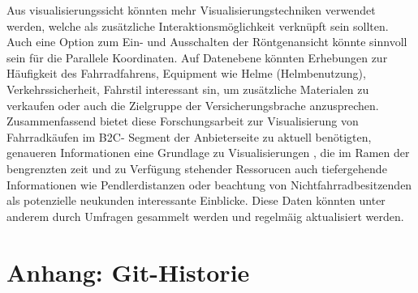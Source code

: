 \documentclass[usegeometry=true]{scrartcl}
\begin{document}
Aus visualisierungssicht könnten mehr Visualisierungstechniken verwendet werden, welche als zusätzliche Interaktionsmöglichkeit verknüpft sein sollten. Auch eine Option zum Ein- und Ausschalten der Röntgenansicht könnte sinnvoll sein für die Parallele Koordinaten. 
Auf Datenebene könnten Erhebungen zur Häufigkeit des Fahrradfahrens, Equipment wie Helme (Helmbenutzung), Verkehrssicherheit, Fahrstil interessant sin, um zusätzliche Materialen zu verkaufen oder auch die Zielgruppe der Versicherungsbrache anzusprechen. 
Zusammenfassend bietet diese Forschungsarbeit zur Visualisierung von Fahrradkäufen im B2C- Segment der Anbieterseite zu aktuell benötigten, genaueren Informationen eine Grundlage zu Visualisierungen , die im Ramen der bengrenzten zeit und zu Verfügung stehender Ressorucen auch tiefergehende Informationen wie Pendlerdistanzen oder beachtung von Nichtfahrradbesitzenden als potenzielle neukunden interessante Einblicke. Diese Daten könnten unter anderem durch Umfragen gesammelt werden und regelmäig aktualisiert werden. 


\section*{Anhang: Git-Historie}
\newpage

\end{document}
